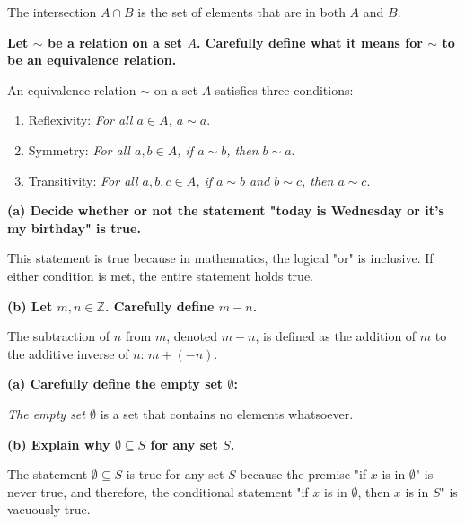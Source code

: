 The intersection \( A \cap B \) is the set of elements that are in both \( A \) and \( B \).


\textbf{Let \( \sim \) be a relation on a set \( A \). Carefully define what it means for \( \sim \) to be an equivalence relation.}

An equivalence relation \( \sim \) on a set \( A \) satisfies three conditions:
\begin{enumerate}
    \item Reflexivity: \textit{For all \( a \in A \), \( a \sim a \)}.
    \item Symmetry: \textit{For all \( a, b \in A \), if \( a \sim b \), then \( b \sim a \)}.
    \item Transitivity: \textit{For all \( a, b, c \in A \), if \( a \sim b \) and \( b \sim c \), then \( a \sim c \)}.
\end{enumerate}


\textbf{(a) Decide whether or not the statement "today is Wednesday or it's my birthday" is true.}

This statement is true because in mathematics, the logical "or" is inclusive. If either condition is met, the entire statement holds true.

\textbf{(b) Let \( m, n \in \mathbb{Z} \). Carefully define \( m - n \).}

The subtraction of \( n \) from \( m \), denoted \( m - n \), is defined as the addition of \( m \) to the additive inverse of \( n \): \( m + (-n) \).


\textbf{(a) Carefully define the empty set \( \emptyset \):}

\textit{The empty set \( \emptyset \)} is a set that contains no elements whatsoever.

\textbf{(b) Explain why \( \emptyset \subseteq S \) for any set \( S \).}

The statement \( \emptyset \subseteq S \) is true for any set \( S \) because the premise "if \( x \) is in \( \emptyset \)" is never true, and therefore, the conditional statement "if \( x \) is in \( \emptyset \), then \( x \) is in \( S \)" is vacuously true.


